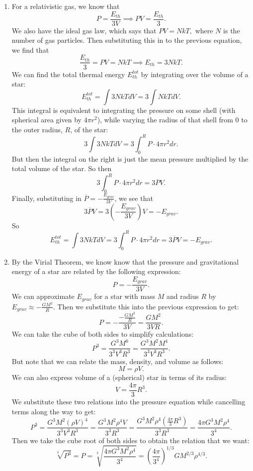 \documentclass[11pt,letterpaper]{article}
\begin{document}
\begin{enumerate}[label=(\alph*)]

    \item
    For a relativistic gas, we know that $$ P = \frac{E_{th}}{3V} \implies PV=\frac{E_{th}}{3}.$$ We also have the ideal gas law, which says that $PV=NkT,$ where $N$ is the number of gas particles. Then substituting this in to the previous equation, we find that $$\frac{E_{th}}{3} = PV = NkT \implies E_{th} = 3NkT.$$ We can find the total thermal energy $E_{th}^{tot}$ by integrating over the volume of a star: $$E_{th}^{tot} = \int3NkTdV = 3\int NkTdV.$$ This integral is equivalent to integrating the pressure on some shell (with spherical area given by $4\pi r^2$), while varying the radius of that shell from 0 to the outer radius, $R$, of the star: $$3\int3NkTdV = 3\int_{0}^{R}P\cdot 4\pi r^2 dr.$$ But then the integral on the right is just the mean pressure multiplied by the total volume of the star. So then $$3\int_{0}^{R}P\cdot 4\pi r^2 dr = 3\overline{P}V.$$ Finally, substituting in  $\overline{P} = -\frac{E_{grav}}{3V}$, we see that $$3\overline{P}V = 3(-\frac{E_{grav}}{3V})V = -E_{grav}.$$ So $$E_{th}^{tot} = \int3NkTdV = 3\int_{0}^{R}P\cdot 4\pi r^2 dr = 3\overline{P}V = -E_{grav}.$$
    
    
    \item
    By the Virial Theorem, we know know that the pressure and gravitational energy of a star are related by the following expression: $$P = -\frac{E_{grav}}{3V}.$$ We can approximate $E_{grav}$ for a star with mass $M$ and radius $R$ by $E_{grav} \approx -\frac{GM^2}{R}.$ Then we substitute this into the previous expression to get: $$P = -\frac{-\frac{GM^2}{R}}{3V} = \frac{GM^2}{3VR}.$$ We can take the cube of both sides to simplify calculations: $$P^3 = \frac{G^3M^6}{3^3V^3R^3} = \frac{G^3M^2M^4}{3^3V^3R^3}.$$ But note that we can relate the mass, density, and volume as follows: $$M = \rho V.$$ We can also express volume of a (spherical) star in terms of its radius: $$V = \frac{4\pi}{3}R^3.$$ We substitute these two relations into the pressure equation while cancelling terms along the way to get: $$P^3 = \frac{G^3M^2(\rho V)^4}{3^3V^3R^3} = \frac{G^3M^2\rho^4V}{3^3R^3} = \frac{G^3M^2\rho^4(\frac{4\pi}{3}R^3)}{3^3R^3} = \frac{4\pi G^3M^2\rho^4}{3^4}.$$ Then we take the cube root of both sides to obtain the relation that we want: $$\sqrt[3]{P^3} = P = \sqrt[3]{\frac{4\pi G^3M^2\rho^4}{3^4}} = (\frac{4\pi}{3^4})^{1/3}GM^{2/3}\rho^{4/3}.$$
    

\end{enumerate}
\end{document}
